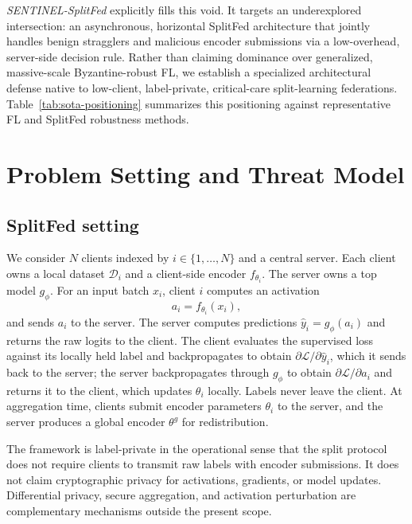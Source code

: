 \documentclass[pdflatex,sn-mathphys-num]{sn-jnl}
\begin{document}
\emph{SENTINEL-SplitFed} explicitly fills this void. It targets an underexplored intersection: an asynchronous, horizontal SplitFed architecture that jointly handles benign stragglers and malicious encoder submissions via a low-overhead, server-side decision rule. Rather than claiming dominance over generalized, massive-scale Byzantine-robust FL, we establish a specialized architectural defense native to low-client, label-private, critical-care split-learning federations. Table~\ref{tab:sota-positioning} summarizes this positioning against representative FL and SplitFed robustness methods.

\section{Problem Setting and Threat Model}\label{sec:problem}

\subsection{SplitFed setting}

We consider $N$ clients indexed by $i\in\{1,\ldots,N\}$ and a central server. Each client owns a local dataset $\mathcal{D}_i$ and a client-side encoder $f_{\theta_i}$. The server owns a top model $g_\phi$. For an input batch $x_i$, client $i$ computes an activation
\begin{equation}
    a_i = f_{\theta_i}(x_i),
\end{equation}
and sends $a_i$ to the server. The server computes predictions $\hat{y}_i = g_\phi(a_i)$ and returns the raw logits to the client. The client evaluates the supervised loss against its locally held label and backpropagates to obtain $\partial \mathcal{L}/\partial \hat{y}_i$, which it sends back to the server; the server backpropagates through $g_\phi$ to obtain $\partial \mathcal{L}/\partial a_i$ and returns it to the client, which updates $\theta_i$ locally. Labels never leave the client. At aggregation time, clients submit encoder parameters $\theta_i$ to the server, and the server produces a global encoder $\theta^g$ for redistribution.

The framework is label-private in the operational sense that the split protocol does not require clients to transmit raw labels with encoder submissions. It does not claim cryptographic privacy for activations, gradients, or model updates. Differential privacy, secure aggregation, and activation perturbation are complementary mechanisms outside the present scope.
\end{document}
